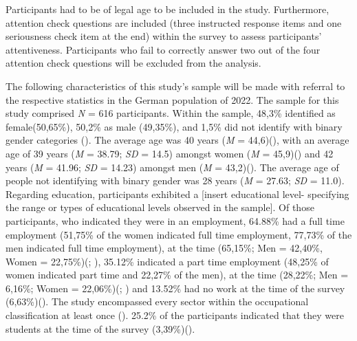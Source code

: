 \documentclass[
  12pt,
  a4paper,
  twoside]{article}
\begin{document}
Participants had to be of legal age to be included in the study. Furthermore, attention check questions are included (three instructed response items and one seriousness check item at the end) within the survey to assess participants' attentiveness. Participants who fail to correctly answer two out of the four attention check questions will be excluded from the analysis.

The following characteristics of this study's sample will be made with referral to the respective statistics in the German population of 2022.
The sample for this study comprised \emph{N} = 616 participants. Within the sample, 48,3\% identified as female(50,65\%), 50,2\% as male (49,35\%), and 1,5\% did not identify with binary gender categories (). The average age was 40 years (\emph{M} = 44,6)(), with an average age of 39 years (\emph{M} = 38.79; \emph{SD} = 14.5) amongst women (\emph{M} = 45,9)() and 42 years (\emph{M} = 41.96; \emph{SD} = 14.23) amongst men (\emph{M} = 43,2)(). The average age of people not identifying with binary gender was 28 years (\emph{M} = 27.63; \emph{SD} = 11.0). Regarding education, participants exhibited a {[}insert educational level- specifying the range or types of educational levels observed in the sample{]}.
Of those participants, who indicated they were in an employment, 64.88\% had a full time employment (51,75\% of the women indicated full time employment, 77,73\% of the men indicated full time employment), at the time (65,15\%; Men = 42,40\%, Women = 22,75\%)(; ), 35.12\% indicated a part time employment (48,25\% of women indicated part time and 22,27\% of the men), at the time (28,22\%; Men = 6,16\%; Women = 22,06\%)(; ) and 13.52\% had no work at the time of the survey (6,63\%)(). The study encompassed every sector within the occupational classification at least once (). 25.2\% of the participants indicated that they were students at the time of the survey (3,39\%)().
\end{document}
